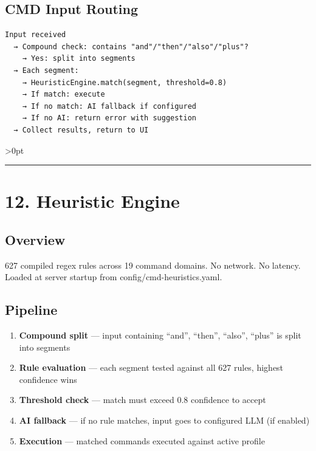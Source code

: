\documentclass[11pt, a4paper, DIV=14]{scrartcl}
\renewcommand{\texttt}[1]{{\ttfamily\fontsize{8.5}{10.5}\selectfont\color{BabbNavy}#1}}
\providecommand{\tightlist}{\setlength{\itemsep}{2pt}\setlength{\parskip}{0pt}}
\let\origRule\rule
\renewcommand{\rule}[3][0pt]{%
  \ifnum\dimexpr#3\relax>0pt
    \par\vspace{2pt}\noindent{\color{BabbBorder}\origRule[#1]{#2}{#3}}\par\vspace{2pt}%
  \else
    \origRule[#1]{#2}{#3}%
  \fi
}
\begin{document}
\subsection{CMD Input Routing}\label{cmd-input-routing}

\begin{verbatim}
Input received
  → Compound check: contains "and"/"then"/"also"/"plus"?
    → Yes: split into segments
  → Each segment:
    → HeuristicEngine.match(segment, threshold=0.8)
    → If match: execute
    → If no match: AI fallback if configured
    → If no AI: return error with suggestion
  → Collect results, return to UI
\end{verbatim}

\begin{center}\rule{0.5\linewidth}{0.5pt}\end{center}

\section{12. Heuristic Engine}\label{heuristic-engine}

\subsection{Overview}\label{overview-2}

627 compiled regex rules across 19 command domains. No network. No
latency. Loaded at server startup from
\texttt{config/cmd-heuristics.yaml}.

\subsection{Pipeline}\label{pipeline}

\begin{enumerate}
\def\labelenumi{\arabic{enumi}.}
\tightlist
\item
  \textbf{Compound split} --- input containing ``and'', ``then'',
  ``also'', ``plus'' is split into segments
\item
  \textbf{Rule evaluation} --- each segment tested against all 627
  rules, highest confidence wins
\item
  \textbf{Threshold check} --- match must exceed 0.8 confidence to
  accept
\item
  \textbf{AI fallback} --- if no rule matches, input goes to configured
  LLM (if enabled)
\item
  \textbf{Execution} --- matched commands executed against active
  profile
\end{enumerate}
\end{document}
